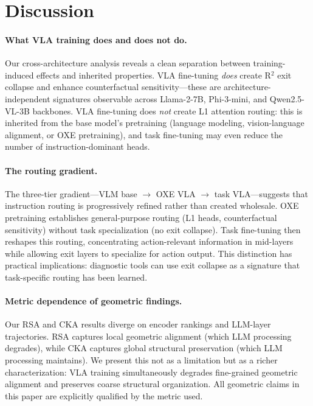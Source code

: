 \documentclass[letterpaper]{article}
\begin{document}
\section{Discussion}
\label{sec:discussion}

\paragraph{What VLA training does and does not do.}
Our cross-architecture analysis reveals a clean separation between training-induced effects and inherited properties.
VLA fine-tuning \emph{does} create R$^2$ exit collapse and enhance counterfactual sensitivity---these are architecture-independent signatures observable across Llama-2-7B, Phi-3-mini, and Qwen2.5-VL-3B backbones.
VLA fine-tuning does \emph{not} create L1 attention routing: this is inherited from the base model's pretraining (language modeling, vision-language alignment, or OXE pretraining), and task fine-tuning may even reduce the number of instruction-dominant heads.

\paragraph{The routing gradient.}
The three-tier gradient---VLM base $\to$ OXE VLA $\to$ task VLA---suggests that instruction routing is progressively refined rather than created wholesale.
OXE pretraining establishes general-purpose routing (L1 heads, counterfactual sensitivity) without task specialization (no exit collapse).
Task fine-tuning then reshapes this routing, concentrating action-relevant information in mid-layers while allowing exit layers to specialize for action output.
This distinction has practical implications: diagnostic tools can use exit collapse as a signature that task-specific routing has been learned.

\paragraph{Metric dependence of geometric findings.}
Our RSA and CKA results diverge on encoder rankings and LLM-layer trajectories.
RSA captures local geometric alignment (which LLM processing degrades), while CKA captures global structural preservation (which LLM processing maintains).
We present this not as a limitation but as a richer characterization: VLA training simultaneously degrades fine-grained geometric alignment and preserves coarse structural organization.
All geometric claims in this paper are explicitly qualified by the metric used.
\end{document}
